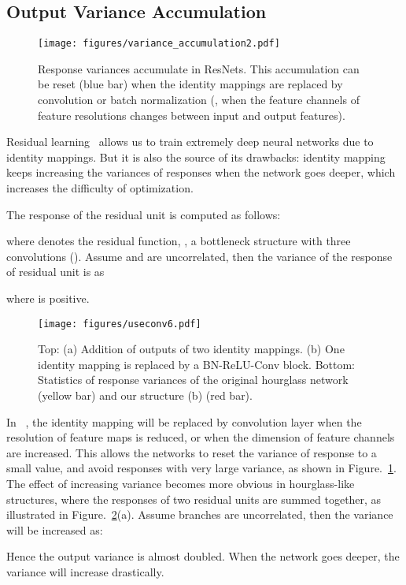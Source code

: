 \documentclass[10pt,twocolumn,letterpaper]{article}
\begin{document}
\subsection{Output Variance Accumulation}\label{sec:control_va}
\begin{figure}[t]
	\begin{center}
		\texttt{[image: figures/variance\_accumulation2.pdf]}
	\end{center}
	\caption{ Response variances accumulate in ResNets. This accumulation can be reset (blue bar) when the identity mappings are replaced by convolution or batch normalization (\ie, when the feature channels of feature resolutions changes between input and output features).}
	\label{fig:variance_accumulation}
	\vspace{-1.5em}
\end{figure}
Residual learning~\cite{he2016deep,he2016identity} allows us to train extremely deep neural networks due to  identity mappings. 
But it is also the source of its drawbacks: identity mapping keeps increasing the variances of responses when the network goes deeper, which increases the difficulty of optimization. 

The response of the residual unit is computed as follows:
{\small

}
\!\!where  denotes the residual function, \eg, a bottleneck structure with three convolutions (). 
Assume  and  are uncorrelated, then the variance of the response of residual unit is as
{\small

}
\!\!where  is positive. 

\begin{figure}[t]
	\begin{center}
		\texttt{[image: figures/useconv6.pdf]}
	\end{center}
		\vspace{-0.3em}
	\caption{ 
	Top: (a) Addition of outputs of two identity mappings. 
	(b) One identity mapping is replaced by a BN-ReLU-Conv block. 
	Bottom: Statistics of response variances of the original hourglass network (yellow bar) and our structure (b) (red bar).
}
	\label{fig:Useconv}
	\vspace{-1em}
\end{figure}

In ~\cite{he2016deep,he2016identity}, the identity mapping will be replaced by convolution layer when the resolution of feature maps is reduced, or when the dimension of feature channels are increased. 
This allows the networks to reset the variance of response to a small value, and avoid responses with very large variance, as shown in Figure.~\ref{fig:variance_accumulation}. 
The effect of increasing variance becomes more obvious in hourglass-like structures, where the responses of two residual units are summed together, as illustrated in Figure.~\ref{fig:Useconv}(a). 
Assume branches are uncorrelated, then the variance will be increased as:
{\small

}
\!\!Hence the output variance is almost doubled. When the network goes deeper, the variance will increase drastically.
\end{document}
